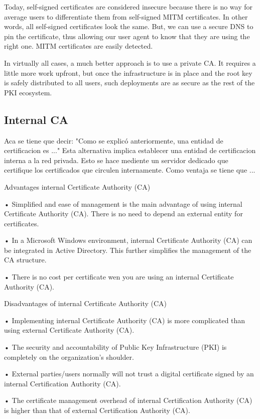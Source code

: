Today, self-signed certificates are considered insecure because there is no way for average users to
differentiate them from self-signed MITM certificates. In other words, all self-signed certificates
look the same. But, we can use a secure DNS to pin the certificate, thus allowing our user agent to
know that they are using the right one. MITM certificates are easily detected.

In virtually all cases, a much better approach is to use a private
CA. It requires a little more work upfront, but once the
infrastructure is in place and the root key is safely distributed to
all users, such deployments are as secure as the rest of the PKI
ecosystem.
\subsection{Internal CA}

Aca se tiene que decir: "Como se explicó anteriormente, una entidad de certificacion es ..."
Esta alternativa implica establecer una entidad de certificacion interna a la red privada. Esto se hace 
mediente un servidor dedicado que certifique los certificados que circulen internamente.
Como ventaja se tiene que ... 

Advantages internal Certificate Authority (CA)

• Simplified and ease of management is the main advantage of using internal Certificate 
Authority (CA). There is no need to depend an external entity for certificates.

• In a Microsoft Windows environment, internal Certificate Authority (CA) can be integrated in Active
 Directory. This further simplifies the management of the CA structure.

• There is no cost per certificate wen you are using an internal Certificate Authority (CA).

Disadvantages of internal Certificate Authority (CA)

• Implementing internal Certificate Authority (CA) is more complicated than using external 
Certificate Authority (CA).

• The security and accountability of Public Key Infrastructure (PKI) is completely on the 
organization's shoulder.

• External parties/users normally will not trust a digital certificate signed by an internal Certification 
Authority (CA).

• The certificate management overhead of internal Certification Authority (CA) is higher than that 
of external Certification Authority (CA).

